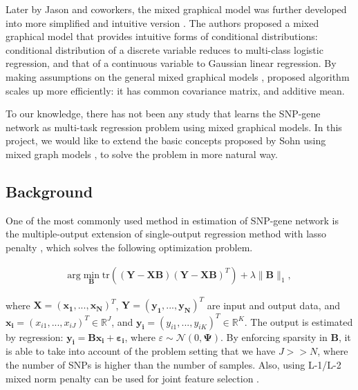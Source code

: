 \documentclass{article}
\begin{document}
Later by Jason and coworkers, the mixed graphical model was further developed into more simplified and intuitive version \cite{lee2013structure}. 
The authors proposed a mixed graphical model that provides intuitive forms of conditional distributions: conditional distribution of a discrete variable reduces to multi-class logistic regression, and that of a continuous variable to Gaussian linear regression. 
By making assumptions on the general mixed graphical models  \cite{lauritzen1989graphical}, proposed algorithm scales up more efficiently: it has common covariance matrix, and additive mean.


To our knowledge, there has not been any study that learns the SNP-gene network as multi-task regression problem using mixed graphical models. 
In this project, we would like to extend the basic concepts proposed by Sohn  \cite{sohn2012joint} using mixed graph models \cite{lee2013structure}, to solve the problem in more natural way.







\subsection{Background}
One of the most commonly used method in estimation of SNP-gene network is the multiple-output extension of single-output regression method with lasso penalty \cite{tibshirani1996regression}, which solves the following optimization problem.

\begin{align}\label{eq:lasso}
\text{arg} \min_{\textbf{B}} \text{tr}((\mathbf{Y}-\mathbf{XB})(\mathbf{Y}-\mathbf{XB})^T) + \lambda \| \mathbf{B}\|_1,
\end{align}

where $\mathbf{X}=(\mathbf{x_1}, ... ,\mathbf{x_N})^T$, $\mathbf{Y}=(\mathbf{y_1}, ... ,\mathbf{y_N})^T$ are input and output data, and $\mathbf{x_i}=(x_{i1}, ... ,x_{iJ})^T \in \mathbb{R}^J$, and $\mathbf{y_i}=(y_{i1}, ... ,y_{iK})^T \in \mathbb{R}^K$.
The output is estimated by regression: $\mathbf{y_i}=\mathbf{Bx_i}+\mathbf{\varepsilon_i}$, where $\varepsilon  \sim \mathcal{N}(0, \mathbf{\Psi})$.
By enforcing sparsity in \textbf{B}, it is able to take into account of the problem setting that we have $J >> N$, where the number of SNPs is higher than the number of samples. Also, using L-1/L-2 mixed norm penalty can be used for joint feature selection \cite{obozinski2008high}.
\end{document}
